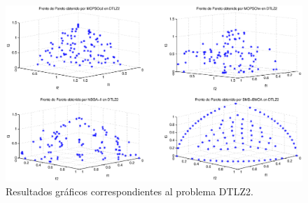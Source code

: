\begin{figure}
      \begin{center}
	  \includegraphics[scale=0.45]{Cap4/rdtlz2r.eps}
      \end{center}
	\caption{Resultados gr\'aficos correspondientes al problema DTLZ2.}
      \label{fig:rDTLZ2}
      \end{figure}

      \clearpage
      \newpage
 
